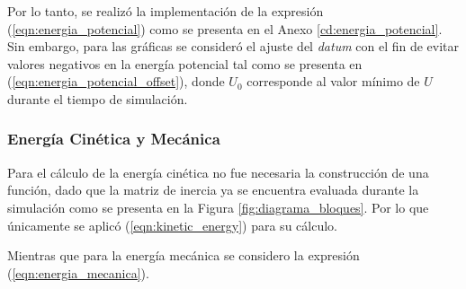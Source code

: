     Por lo tanto, se realizó la implementación de la expresión
    (\ref{eqn:energia_potencial}) como se presenta en el Anexo \ref{cd:energia_potencial}. Sin embargo, para las gráficas se consideró el ajuste del \emph{datum} con el fin de
    evitar valores negativos en la energía potencial tal como se presenta en (\ref{eqn:energia_potencial_offset}), donde $U_0$ corresponde al valor mínimo de $U$ durante el
    tiempo de simulación. 

    \subsubsection{Energía Cinética y Mecánica}
    \noindent Para el cálculo de la energía cinética no fue necesaria la construcción de una función, dado que la matriz de inercia ya se encuentra evaluada durante la simulación como
    se presenta en la Figura \ref{fig:diagrama_bloques}. Por lo que únicamente se aplicó (\ref{eqn:kinetic_energy}) para su cálculo. 

    Mientras que para la energía mecánica se considero la expresión (\ref{eqn:energia_mecanica}).